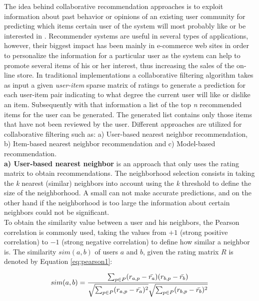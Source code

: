 The idea behind collaborative recommendation approaches is to exploit
information about past behavior or opinions of an existing user
community for predicting which items certain user of the system will
most probably like or be interested in \cite{jannach2010recommender}. 
Recommender systems are useful in several types of  applications,
however, their biggest impact has been mainly in e-commerce web sites
in order to personalize the information for a particular user as the
system can help to promote several items of his or her interest, thus
increasing the sales of the on-line store. In traditional
implementations a collaborative filtering algorithm takes as
input a given \textit{user-item} sparse matrix of ratings to generate a
prediction for each user-item pair indicating to what degree the
current user will like or dislike an item. Subsequently with that
information a list of the top \textit{n} recommended items for the
user can be generated. The generated list contains only those items
that have not been reviewed by the user. Different approaches are
utilized for collaborative filtering such as: a) User-based nearest 
neighbor recommendation, b) Item-based nearest neighbor 
recommendation and c) Model-based recommendation.\\
\textbf{a) User-based nearest neighbor} is an approach that only 
uses the rating matrix to obtain recommendations. 
The neighborhood selection consists in taking
the \textit{k} nearest (similar) neighbors into account using the 
\textit{k} threshold to define the size of the neighborhood. A small 
 can not make accurate predictions, and on the 
other hand if the neighborhood
is too large the information about certain neighbors could not be
significant.\\ To obtain the similarity value between a user and his
neighbors, the Pearson correlation is commonly used, taking
the values from $+1$ (strong positive correlation) to $-1$ (strong
negative correlation) to define how similar a neighbor is. The
similarity $sim(a,b)$ of users $a$ and $b$, given the rating matrix
$R$ is denoted by Equation \ref{eq:pearson1}:

\begin{equation}\label{eq:pearson1}
\displaystyle sim(a,b) = {\sum_{p \in P}(r_{a,p} - 
\bar{r_a})(r_{b,p}- \bar{r_b}) 
\over \sqrt{\sum_{p \in P}(r_{a,p} - \bar{r_a})^2} 
\sqrt{\sum_{p \in P} 
(r_{b,p}- \bar{r_b})^2}}
\end{equation}

